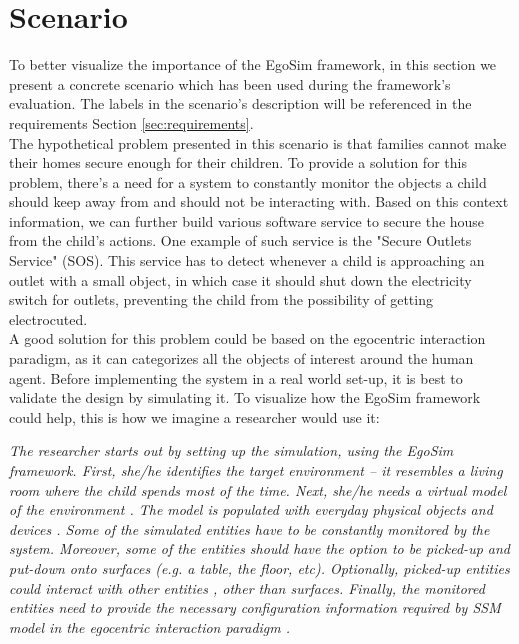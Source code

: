 \section{Scenario} %
\label{sec:scenario}
To better visualize the importance of the EgoSim framework, in this section we present a concrete scenario which has been used during the framework's evaluation. The labels in the scenario's description will be referenced in the requirements Section \ref{sec:requirements}.\\

The hypothetical problem presented in this scenario is that families cannot make their homes secure enough for their children. To provide a solution for this problem, there's a need for a system to constantly monitor the objects a child should keep away from and should not be interacting with. Based on this context information, we can further build various software service to secure the house from the child's actions. One example of such service is the "Secure Outlets Service" (SOS). This service has to detect whenever a child is approaching an outlet with a small object, in which case it should shut down the electricity switch for outlets, preventing the child from the possibility of getting electrocuted.\\

A good solution for this problem could be based on the egocentric interaction paradigm, as it can categorizes all the objects of interest around the human agent. Before implementing the system in a real world set-up, it is best to validate the design by simulating it. To visualize how the EgoSim framework could help, this is how we imagine a researcher would use it:

\begin{flushright}{\slshape
The researcher starts out by setting up the simulation, using the EgoSim framework. First, she/he identifies the target environment -- it resembles a living room where the child spends most of the time. Next, she/he 
needs a virtual model of the environment . The model is populated  with everyday physical objects  and devices . Some of the simulated entities have to be constantly monitored  by the system. Moreover, some of the entities should have the option to be picked-up  and put-down  onto surfaces  (e.g. a table, the floor, etc). Optionally, picked-up entities could interact with other entities , other than surfaces. Finally, the monitored entities need to provide the necessary configuration information required by SSM model in the egocentric interaction paradigm .
} \\ \medskip
\end{flushright}

